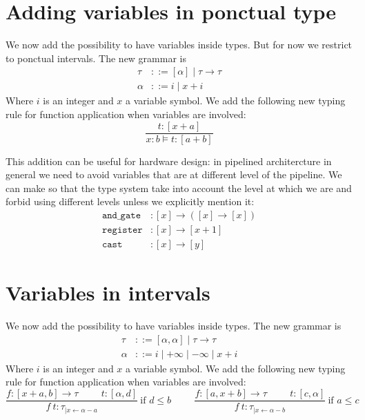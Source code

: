 \documentclass{article}
\newcommand{\substitution}[2]{\ensuremath{#1_{|#2}}}
\begin{document}
\section{Adding variables in ponctual type}

We now add the possibility to have variables inside types.
But for now we restrict to ponctual intervals.
The new grammar is
\begin{align*}
 \tau & ::= [\alpha] \mid \tau \rightarrow \tau \\
 \alpha & ::= i \mid x + i 
\end{align*}
Where $i$ is an integer and $x$ a variable symbol.
We add the following new typing rule for function application when variables are involved:
\[ \frac{t : [x+a]}{ x:b \models t : [a+b]} \]

This addition can be useful for hardware design: in pipelined architercture in general we need to avoid variables that are at different level of the pipeline.
We can make so that the type system take into account the level at which we are and forbid using different levels unless we explicitly mention it:
\begin{align*}
\texttt{and\_gate} & : [x] \rightarrow ([x] \rightarrow [x]) \\
\texttt{register} & : [x] \rightarrow [x+1] \\
\texttt{cast} & : [x] \rightarrow [y]
\end{align*}


\section{Variables in intervals}

We now add the possibility to have variables inside types.
The new grammar is
\begin{align*}
 \tau & ::= [\alpha,\alpha] \mid \tau \rightarrow \tau \\
 \alpha & ::= i \mid +\infty \mid -\infty \mid x + i 
\end{align*}
Where $i$ is an integer and $x$ a variable symbol.
We add the following new typing rule for function application when variables are involved:
\[ \frac{f : [x+a,b] \rightarrow \tau \hspace{1cm} t : [\alpha,d]}{ f~t : \substitution{\tau}{x\leftarrow \alpha-a}} ~\text{if } d \le b
\hspace{1cm} \frac{f : [a,x+b] \rightarrow \tau \hspace{1cm} t : [c,\alpha]}{ f~t : \substitution{\tau}{x\leftarrow \alpha-b}} ~\text{if } a \le c\]
\end{document}
